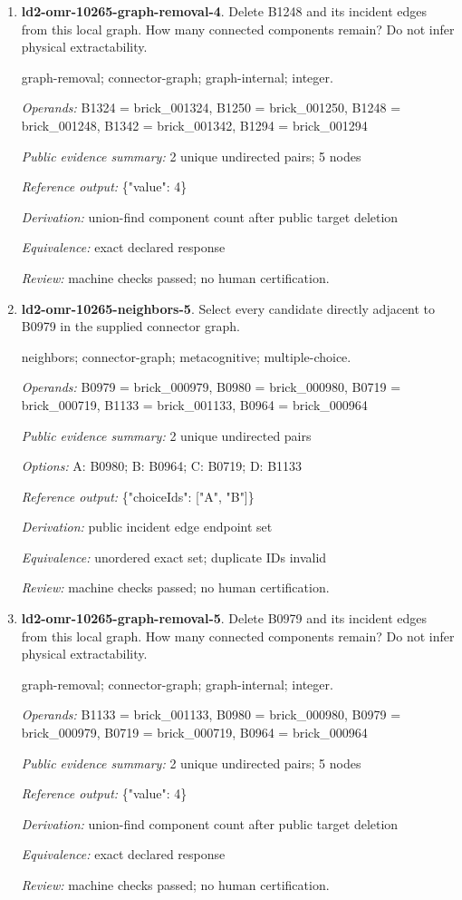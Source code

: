 \begin{enumerate}
\item \textbf{ld2-omr-10265-graph-removal-4}. Delete B1248 and its incident edges from this local graph. How many connected components remain? Do not infer physical extractability.
\par{\small graph-removal; connector-graph; graph-internal; integer.\par\textit{Operands:} B1324 = brick\_001324, B1250 = brick\_001250, B1248 = brick\_001248, B1342 = brick\_001342, B1294 = brick\_001294\par\textit{Public evidence summary:} 2 unique undirected pairs; 5 nodes\par\textit{Reference output:} \{"value": 4\}\par\textit{Derivation:} union-find component count after public target deletion\par\textit{Equivalence:} exact declared response\par\textit{Review:} machine checks passed; no human certification.}
\item \textbf{ld2-omr-10265-neighbors-5}. Select every candidate directly adjacent to B0979 in the supplied connector graph.
\par{\small neighbors; connector-graph; metacognitive; multiple-choice.\par\textit{Operands:} B0979 = brick\_000979, B0980 = brick\_000980, B0719 = brick\_000719, B1133 = brick\_001133, B0964 = brick\_000964\par\textit{Public evidence summary:} 2 unique undirected pairs\par\textit{Options:} A: B0980; B: B0964; C: B0719; D: B1133\par\textit{Reference output:} \{"choiceIds": ["A", "B"]\}\par\textit{Derivation:} public incident edge endpoint set\par\textit{Equivalence:} unordered exact set; duplicate IDs invalid\par\textit{Review:} machine checks passed; no human certification.}
\item \textbf{ld2-omr-10265-graph-removal-5}. Delete B0979 and its incident edges from this local graph. How many connected components remain? Do not infer physical extractability.
\par{\small graph-removal; connector-graph; graph-internal; integer.\par\textit{Operands:} B1133 = brick\_001133, B0980 = brick\_000980, B0979 = brick\_000979, B0719 = brick\_000719, B0964 = brick\_000964\par\textit{Public evidence summary:} 2 unique undirected pairs; 5 nodes\par\textit{Reference output:} \{"value": 4\}\par\textit{Derivation:} union-find component count after public target deletion\par\textit{Equivalence:} exact declared response\par\textit{Review:} machine checks passed; no human certification.}

\end{enumerate}

